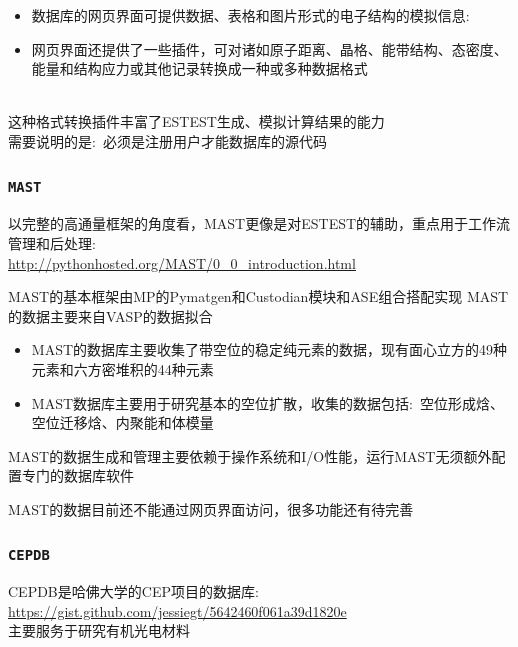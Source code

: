 {{{{{\begin{itemize}
	\item 数据库的网页界面可提供数据、表格和图片形式的电子结构的模拟信息:\\
		{\fontsize{6.5pt}{4.2pt}\selectfont{包括计算参数、原子信息、能量结果和结构应力与光谱信息}}

	\item 网页界面还提供了一些插件，可对诸如原子距离、晶格、能带结构、态密度、能量和结构应力或其他记录转换成一种或多种数据格式\\
{\fontsize{6.5pt}{4.2pt}}\\
\end{itemize}
这种格式转换插件丰富了\textrm{ESTEST}生成、模拟计算结果的能力\\
需要说明的是:~必须是注册用户才能数据库的源代码}}
}

\frame
{
\frametitle{\tt{MAST}}
以完整的高通量框架的角度看，\textrm{MAST}更像是对\textrm{ESTEST}的辅助，重点用于工作流管理和后处理:\\
\url{http://pythonhosted.org/MAST/0_0_introduction.html}

\textrm{MAST}的基本框架由\textrm{MP}的\textrm{Pymatgen}和\textrm{Custodian}模块和\textrm{ASE}组合搭配实现
\vskip 2pt
{\fontsize{6.5pt}{4.2pt}}
\vskip 2pt
\textrm{MAST}的数据主要来自\textrm{VASP}的数据拟合\\

\begin{itemize}
	\item \textrm{MAST}的数据库主要收集了带空位的稳定纯元素的数据，现有面心立方的\textrm{49}种元素和六方密堆积的\textrm{44}种元素
	\item \textrm{MAST}数据库主要用于研究基本的空位扩散，收集的数据包括:~空位形成焓、空位迁移焓、内聚能和体模量
\end{itemize}
\textrm{MAST}的数据生成和管理主要依赖于操作系统和\textrm{I/O}性能，运行\textrm{MAST}无须额外配置专门的数据库软件

\textrm{MAST}的数据目前还不能通过网页界面访问，很多功能还有待完善

}

\frame
{
\frametitle{\tt{CEPDB}}
\textrm{CEPDB}是哈佛大学的\textrm{CEP}项目的数据库:\\%
\url{https://gist.github.com/jessiegt/5642460f061a39d1820e}\\
主要服务于研究有机光电材料

}}}
